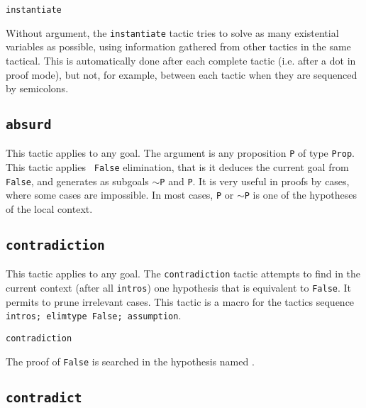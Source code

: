 \begin{coq_example*}
\begin{Variants}
  \item {\tt instantiate}

    Without argument, the {\tt instantiate} tactic tries to solve as
    many existential variables as possible, using information gathered
    from other tactics in the same tactical. This is automatically
    done after each complete tactic (i.e. after a dot in proof mode),
    but not, for example, between each tactic when they are sequenced
    by semicolons.

\end{Variants}

\subsection{\tt absurd \term}
\label{absurd}

This tactic applies to any goal. The argument {\term} is any
proposition {\tt P} of type {\tt Prop}. This tactic applies {\tt
  False} elimination, that is it deduces the current goal from {\tt
  False}, and generates as subgoals {\tt $\sim$P} and {\tt P}. It is
very useful in proofs by cases, where some cases are impossible. In
most cases, \texttt{P} or $\sim$\texttt{P} is one of the hypotheses of
the local context.

\subsection{\tt contradiction}
\label{contradiction}

This tactic applies to any goal. The {\tt contradiction} tactic
attempts to find in the current context (after all {\tt intros}) one
hypothesis that is equivalent to {\tt False}. It permits to prune
irrelevant cases. This tactic is a macro for the tactics sequence
{\tt intros; elimtype False; assumption}.

\begin{ErrMsgs}
\item {}
\end{ErrMsgs}

\begin{Variants}
\item {\tt contradiction \ident}

The proof of {\tt False} is searched in the hypothesis named \ident.
\end{Variants}

\subsection{\tt contradict \ident}
\label{contradict}


\end{coq_example*}
